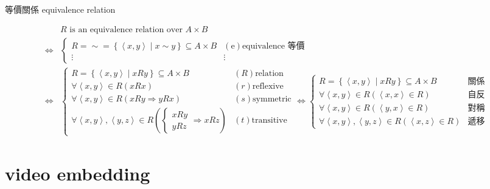 \documentclass[
]{book}
\theoremstyle{definition}
\theoremstyle{definition}
\theoremstyle{definition}
\theoremstyle{definition}
\theoremstyle{remark}
\begin{document}
\begin{CJK}{UTF8}{bsmi}等價關係 equivalence relation \label{def:equivalence-relation}
\end{CJK}
\begin{CJK}{UTF8}{bsmi}
\begin{align*}
 & R\text{ is an equivalence relation over }A\times B\\
\Leftrightarrow & \begin{cases}
R=\sim=\left\{ \left\langle x,y\right\rangle \middle|x\sim y\right\} \subseteq A\times B & \left(\text{e}\right)\text{equivalence 等價}\\
\vdots & \vdots
\end{cases}\\
\Leftrightarrow & \begin{cases}
R=\left\{ \left\langle x,y\right\rangle \middle|xRy\right\} \subseteq A\times B & \left(R\right)\text{relation}\\
\forall\left\langle x,y\right\rangle \in R\left(xRx\right) & \left(r\right)\text{reflexive}\\
\forall\left\langle x,y\right\rangle \in R\left(xRy\Rightarrow yRx\right) & \left(s\right)\text{symmetric}\\
\forall\left\langle x,y\right\rangle ,\left\langle y,z\right\rangle \in R\left(\begin{cases}
xRy\\
yRz
\end{cases}\Rightarrow xRz\right) & \left(t\right)\text{transitive}
\end{cases}\Leftrightarrow\begin{cases}
R=\left\{ \left\langle x,y\right\rangle \middle|xRy\right\} \subseteq A\times B & \text{關係}\\
\forall\left\langle x,y\right\rangle \in R\left(\left\langle x,x\right\rangle \in R\right) & \text{自反}\\
\forall\left\langle x,y\right\rangle \in R\left(\left\langle y,x\right\rangle \in R\right) & \text{對稱}\\
\forall\left\langle x,y\right\rangle ,\left\langle y,z\right\rangle \in R\left(\left\langle x,z\right\rangle \in R\right) & \text{遞移}
\end{cases}
\end{align*}
\end{CJK}

\hypertarget{video-embedding}{%
\section{video embedding}\label{video-embedding}}
\end{document}
